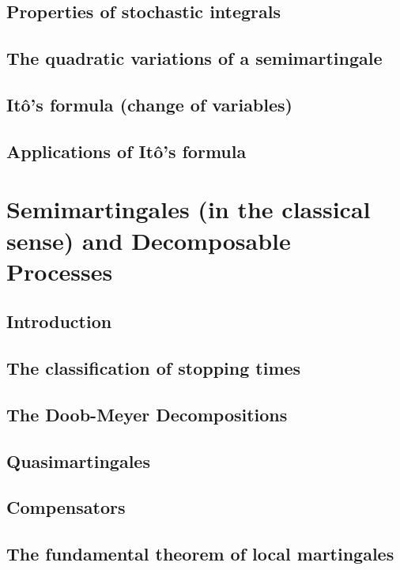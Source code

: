 \documentclass[openany,oneside]{book}
\theoremstyle{definition}
\theoremstyle{remark}
\begin{document}
\section{Properties of stochastic integrals}

\section{The quadratic variations of a semimartingale}

\section{It\^o's formula (change of variables)}

\section{Applications of It\^o's formula}


\chapter{Semimartingales (in the classical sense) and Decomposable Processes}

\section{Introduction}

\section{The classification of stopping times}

\section{The Doob-Meyer Decompositions}

\section{Quasimartingales}

\section{Compensators}

\section{The fundamental theorem of local martingales}
\end{document}
